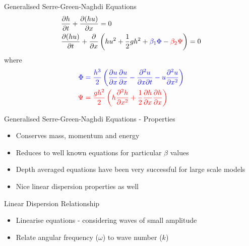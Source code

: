 \documentclass[pdf]{beamer}
\begin{document}
\begin{frame}{Generalised Serre-Green-Naghdi Equations}
\begin{align*}
&\dfrac{\partial h}{\partial t} + \dfrac{\partial (hu)}{\partial x} = 0\\
&\dfrac{\partial (hu)}{\partial t} + \dfrac{\partial }{\partial x} \left( hu^2 + \frac{1}{2}gh^2  +  {\color{blue} {\beta_1} \Phi } -   {\color{red} {\beta_2}\Psi}  \right)= 0 \\
\end{align*}
where
\begin{align*}
\color{blue} \Phi  & \color{blue}= \frac{h^3}{2}\left( \frac{\partial u}{\partial x}\frac{\partial u}{\partial x} - \frac{\partial^2 u}{\partial x \partial t} - u\frac{\partial^2 u}{\partial x^2}\right) \\
\color{red} \Psi & \color{red}=  \frac{gh^2}{2} \left(h \frac{\partial^2 h}{\partial x^2} + \frac{1}{2} \frac{\partial h}{\partial x}\frac{\partial h}{\partial x}\right)
\end{align*}
\end{frame}

\begin{frame}{Generalised Serre-Green-Naghdi Equations - Properties}
\begin{itemize}
	\item Conserves mass, momentum and energy
	\item Reduces to well known equations for particular $\beta$ values
	\item Depth averaged equations have been very successful for large scale models
	\item Nice linear dispersion properties as well
\end{itemize}
\end{frame}


\begin{frame}{Linear Dispersion Relationship}
\begin{itemize}
	\item Linearise equations - considering waves of small amplitude 
	\item Relate angular frequency ($\omega$) to  wave number ($k$)
\end{itemize}
\end{frame}
\end{document}
